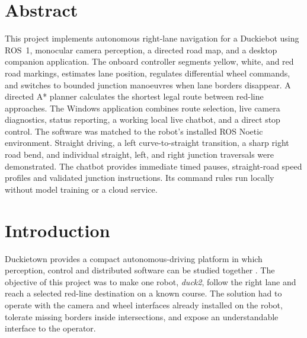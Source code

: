 \documentclass[10pt,a4paper,twocolumn]{article}
\begin{document}

\section{Abstract}

This project implements autonomous right-lane navigation for a Duckiebot using
ROS~1, monocular camera perception, a directed road map, and a desktop companion
application. The onboard controller segments yellow, white, and red road
markings, estimates lane position, regulates differential wheel commands, and
switches to bounded junction manoeuvres when lane borders disappear. A directed
A* planner calculates the shortest legal route between red-line approaches.
The Windows application combines route selection, live camera diagnostics,
status reporting, a working local live chatbot, and a direct stop control. The software was matched to the
robot's installed ROS Noetic environment. Straight driving, a left curve-to-straight
transition, a sharp right road bend, and individual straight, left, and right
junction traversals were demonstrated. The chatbot provides immediate timed pauses, straight-road speed profiles and
validated junction instructions. Its command rules run locally without model
training or a cloud service.

\section{Introduction}

Duckietown provides a compact autonomous-driving platform in which perception,
control and distributed software can be studied together
\cite{paull2017duckietown}. The objective of this project was to make one robot,
\emph{duck2}, follow the right lane and reach a selected red-line destination on
a known course. The solution had to operate with the camera and wheel interfaces
already installed on the robot, tolerate missing borders inside intersections,
and expose an understandable interface to the operator.
\end{document}
